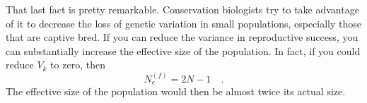 \documentclass[12pt]{article}
\begin{document}
\noindent That last fact is pretty remarkable. Conservation biologists
try to take advantage of it to decrease the loss of genetic variation
in small populations, especially those that are captive bred. If you
can reduce the variance in reproductive success, you can substantially
increase the effective size of the population. In fact, if you could
reduce $V_k$ to zero, then
\[
N_e^{(f)} = 2N - 1 \quad .
\]
The effective size of the population would then be almost twice its
actual size.




\ccLicense
\end{document}
